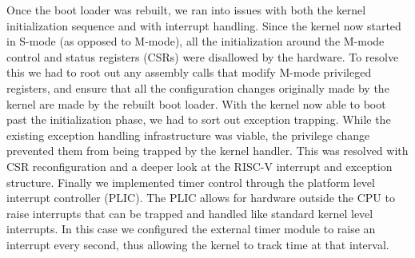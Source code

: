 Once the boot loader was rebuilt, we ran into issues with both the kernel initialization sequence and with interrupt handling. Since the kernel now started in S-mode (as opposed to M-mode), all the initialization around the M-mode control and status registers (CSRs) were disallowed by the hardware. To resolve this we had to root out any assembly calls that modify M-mode privileged registers, and ensure that all the configuration changes originally made by the kernel are made by the rebuilt boot loader. With the kernel now able to boot past the initialization phase, we had to sort out exception trapping. While the existing exception handling infrastructure was viable, the privilege change prevented them from being trapped by the kernel handler. This was resolved with CSR reconfiguration and a deeper look at the RISC-V interrupt and exception structure. Finally we implemented timer control through the platform level interrupt controller (PLIC). The PLIC allows for hardware outside the CPU to raise interrupts that can be trapped and handled like standard kernel level interrupts. In this case we configured the external timer module to raise an interrupt every second, thus allowing the kernel to track time at that interval.
